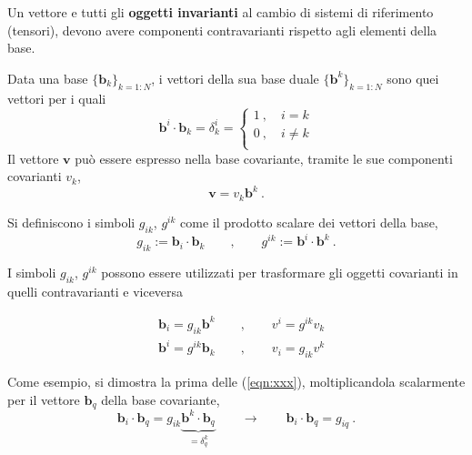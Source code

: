 Un vettore e tutti gli \textbf{oggetti invarianti} al cambio di sistemi di riferimento (tensori), devono avere componenti contravarianti rispetto agli elementi della base.

\begin{definition}
Data una base $\{\bm{b}_k\}_{k=1:N}$, i vettori della sua base duale $\{\bm{b}^k\}_{k=1:N}$ sono quei vettori per i quali
\begin{equation}
 \bm{b}^i \cdot \bm{b}_k = \delta^i_k =
 \begin{cases}
   1 \ , \quad i  =   k \\
   0 \ , \quad i \neq k \\
 \end{cases}
\end{equation}
Il vettore $\bm{v}$ può essere espresso nella base covariante, tramite le sue componenti covarianti $v_k$,
\begin{equation}
  \bm{v} = v_k \bm{b}^k \ .
\end{equation}
\end{definition}

\begin{definition}[Simboli $g_{ik}$ e $g^{ik}$]
Si definiscono i simboli $g_{ik}$, $g^{ik}$ come il prodotto scalare dei vettori della base,
\begin{equation}
 g_{ik} := \bm{b}_i \cdot \bm{b}_k  \qquad , \qquad
 g^{ik} := \bm{b}^i \cdot \bm{b}^k \ .
\end{equation}
\end{definition}
%
I simboli $g_{ik}$, $g^{ik}$ possono essere utilizzati per trasformare gli oggetti covarianti in quelli contravarianti e viceversa
\begin{fBox}
\begin{equation}\label{eqn:xxx}
\begin{aligned}
 &  \bm{b}_i = g_{ik} \bm{b}^k  \qquad , \qquad v^i = g^{ik} v_k \\
 &  \bm{b}^i = g^{ik} \bm{b}_k  \qquad , \qquad v_i = g_{ik} v^k
\end{aligned}
\end{equation}
\end{fBox}
%
Come esempio, si dimostra la prima delle (\ref{eqn:xxx}), moltiplicandola scalarmente per il vettore $\bm{b}_q$ della base covariante,
\begin{equation}
 \bm{b}_i \cdot \bm{b}_q = g_{ik} \underbrace{\bm{b}^k \cdot \bm{b}_q}_{=\delta^k_q}  \qquad \rightarrow \qquad \bm{b}_i \cdot \bm{b}_q = g_{iq} \ .
\end{equation}

